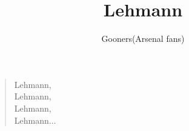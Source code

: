 \documentclass[a4paper,12pt]{article}
\title{Lehmann}
\author{Gooners(Arsenal fans)}
\date{}
\begin{document}
	
	\maketitle
	
	\begin{verse}
		
		Lehmann, \\
		Lehmann, \\
		Lehmann, \\
		Lehmann$\ldots$
		
	\end{verse}
	
\end{document}
